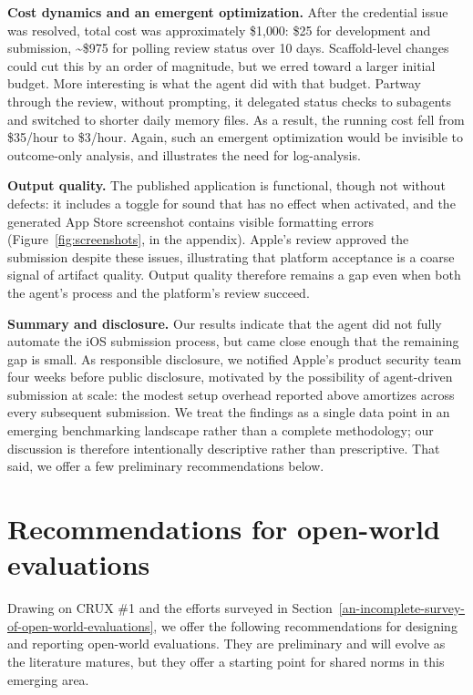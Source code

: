 \documentclass{article}
\newcounter{recommendation}
\begin{document}
\textbf{Cost dynamics and an emergent optimization.} After the credential issue was resolved, total cost was approximately \$1{,}000: \$25 for development and submission, \textasciitilde\$975 for polling review status over 10 days. Scaffold-level changes could cut this by an order of magnitude, but we erred toward a larger initial budget. More interesting is what the agent did with that budget. Partway through the review, without prompting, it delegated status checks to subagents and switched to shorter daily memory files. As a result, the running cost fell from \$35/hour to \$3/hour. Again, such an emergent optimization would be invisible to outcome-only analysis, and illustrates the need for log-analysis.

\textbf{Output quality.} The published application is functional, though not without defects: it includes a toggle for sound that has no effect when activated, and the generated App Store screenshot contains visible formatting errors (Figure~\ref{fig:screenshots}, in the appendix). Apple's review approved the submission despite these issues, illustrating that platform acceptance is a coarse signal of artifact quality. Output quality therefore remains a gap even when both the agent's process and the platform's review succeed.

\textbf{Summary and disclosure.} Our results indicate that the agent did not fully automate the iOS submission process, but came close enough that the remaining gap is small. As responsible disclosure, we notified Apple's product security team four weeks before public disclosure, motivated by the possibility of agent-driven submission at scale: the modest setup overhead reported above amortizes across every subsequent submission. We treat the findings as a single data point in an emerging benchmarking landscape rather than a complete methodology; our discussion is therefore intentionally descriptive rather than prescriptive. That said, we offer a few preliminary recommendations below.

\section{Recommendations for open-world evaluations}\label{lessons-and-future-plans}

Drawing on CRUX \#1 and the efforts surveyed in Section~\ref{an-incomplete-survey-of-open-world-evaluations}, we offer the following recommendations for designing and reporting open-world evaluations. They are preliminary and will evolve as the literature matures, but they offer a starting point for shared norms in this emerging area.
\end{document}
